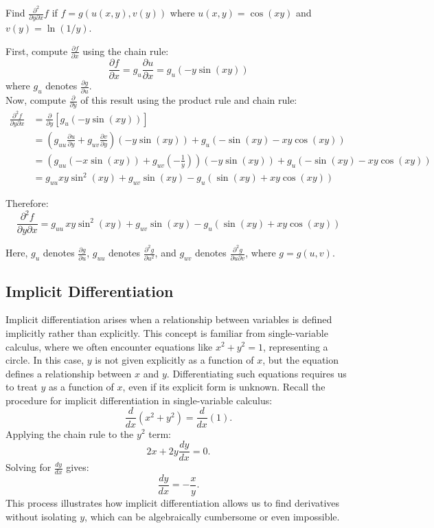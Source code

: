 \begin{example}
Find $\frac{\partial^2}{\partial y\partial x}f$ if $f = g(u(x,y), v(y))$ where $u(x,y) = \cos(xy)$ and $v(y) = \ln(1/y)$.

\begin{solution}
\noindent First, compute $\frac{\partial f}{\partial x}$ using the chain rule:
\[
\frac{\partial f}{\partial x} = g_u \frac{\partial u}{\partial x} = g_u (-y \sin(xy))
\]
\noindent where $g_u$ denotes $\frac{\partial g}{\partial u}$. \\

\noindent Now, compute $\frac{\partial}{\partial y}$ of this result using the product rule and chain rule:
\begin{align*}
\frac{\partial^2 f}{\partial y \partial x} &= \frac{\partial}{\partial y} [g_u (-y \sin(xy))] \\
&= \left( g_{uu} \frac{\partial u}{\partial y} + g_{uv} \frac{\partial v}{\partial y} \right) (-y \sin(xy)) + g_u \left( -\sin(xy) - x y \cos(xy) \right) \\
&= \left( g_{uu} (-x \sin(xy)) + g_{uv} \left( -\frac{1}{y} \right) \right) (-y \sin(xy)) + g_u \left( -\sin(xy) - x y \cos(xy) \right) \\
&= g_{uu} x y \sin^2(xy) + g_{uv} \sin(xy) - g_u (\sin(xy) + x y \cos(xy))
\end{align*}

\noindent Therefore:
\[
\frac{\partial^2 f}{\partial y \partial x} = g_{uu} \, x y \sin^2(xy) + g_{uv} \sin(xy) - g_u (\sin(xy) + x y \cos(xy))
\]

\noindent Here, $g_u$ denotes $\frac{\partial g}{\partial u}$, $g_{uu}$ denotes $\frac{\partial^2 g}{\partial u^2}$, and $g_{uv}$ denotes $\frac{\partial^2 g}{\partial u \partial v}$, where $g = g(u,v)$.
\end{solution}
\end{example}

\exampleline

\subsection*{Implicit Differentiation} 

\noindent Implicit differentiation arises when a relationship between variables is defined implicitly rather than explicitly. This concept is familiar from single-variable calculus, where we often encounter equations like \( x^2 + y^2 = 1 \), representing a circle. In this case, \( y \) is not given explicitly as a function of \( x \), but the equation defines a relationship between \( x \) and \( y \). Differentiating such equations requires us to treat \( y \) as a function of \( x \), even if its explicit form is unknown. Recall the procedure for implicit differentiation in single-variable calculus:
\[
\frac{d}{dx}\left(x^2 + y^2\right) = \frac{d}{dx}(1).
\]
Applying the chain rule to the \( y^2 \) term:
\[
2x + 2y \frac{dy}{dx} = 0.
\]
Solving for \( \frac{dy}{dx} \) gives:
\[
\frac{dy}{dx} = -\frac{x}{y}.
\]
\noindent This process illustrates how implicit differentiation allows us to find derivatives without isolating \( y \), which can be algebraically cumbersome or even impossible. \\

